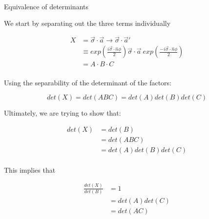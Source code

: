 \begin{answer}


  \begin{answerpart}{Equivalence of determinants}

    We start by separating out the three terms individually
    
    \begin{equation}
      \begin{split}
        X
        &= \vec{\sigma} \cdot \vec{a} \rightarrow \vec{\sigma} \cdot \vec{a}'\\
        &\equiv
        exp \left( \frac{i\vec{\sigma} \cdot \hat{n}\phi}{2}\right)
        \vec{\sigma} \cdot \vec{a} \ 
        exp \left( \frac{-i\vec{\sigma} \cdot \hat{n}\phi}{2}\right)\\
        &= A \cdot B \cdot C\\
      \end{split}
    \end{equation}

    Using the separability of the determinant of the factors:

    \begin{equation}
      det(X) = det(ABC) = det(A) det(B) det(C)
    \end{equation}

    Ultimately, we are trying to show that:

    \begin{equation}
      \begin{split}
        det(X)
        &= det(B) \\
        &= det(ABC) \\
        &= det(A) det(B) det(C) \\
      \end{split}
    \end{equation}

    This implies that
    
    \begin{equation}
      \begin{split}
        \frac{det(X)}{det(B)}
        &= 1 \\
        &= det(A)det(C) \\
        &= det(AC) \\
      \end{split}
    \end{equation}


\end{answerpart}
\end{answer}
